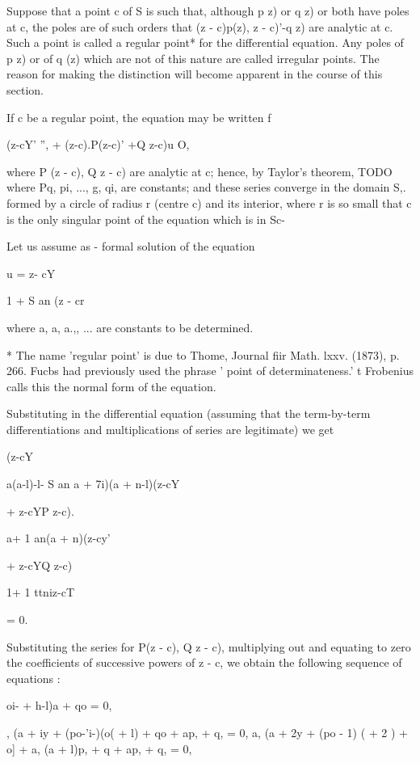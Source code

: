 
Suppose that a point c of S is such that, although p z) or q z) or
both have poles at c, the poles are of such orders that (z - c)p(z), z
- c)'-q z) are analytic at c. Such a point is called a regular point*
for the differential equation. Any poles of p z) or of q (z) which are
not of this nature are called irregular points. The reason for making
the distinction will become apparent in the course of this section.

If c be a regular point, the equation may be written f

(z-cY' '', + (z-c).P(z-c)' +Q z-c)u O,

where P (z - c), Q z - c) are analytic at c; hence, by Taylor's
theorem,
TODO
where Pq, pi, ..., g, qi,  are constants; and these series
converge in the domain S,. formed by a circle of radius r (centre c)
and its interior, where r is so small that c is the only singular
point of the equation which is in Sc-

Let us assume as - formal solution of the equation

u = z- cY

1 + S an (z - cr

where a, a, a.,, ... are constants to be determined.

* The name 'regular point' is due to Thome, Journal fiir Math. lxxv.
(1873), p. 266. Fucbs had previously used the phrase ' point of
determinateness.' t Frobenius calls this the normal form of the
equation.

%
%

Substituting in the differential equation (assuming that the
term-by-term differentiations and multiplications of series are
legitimate) we get

(z-cY

a(a-l)-l- S an a + 7i)(a + n-l)(z-cY

+ z-cYP z-c).

a+ 1 an(a + n)(z-cy'

+ z-cYQ z-c)

1+ 1 ttniz-cT

= 0.

Substituting the series for P(z - c), Q z - c), multiplying out and
equating to zero the coefficients of successive powers of z - c, we
obtain the following sequence of equations :

oi- + h-l)a + qo = 0,

, (a + iy + (po-'i-)(o( + l) + qo + ap, + q, = 0, a, (a + 2y + (po -
1) ( + 2 ) + o] + a, (a + l)p, + q + ap, + q, = 0,

